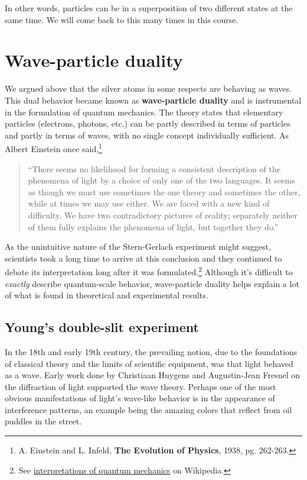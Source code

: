In other words, particles can be in a superposition of two different states at the same time. We will come back to this many times in this course. \par


\section{Wave-particle duality}
We argued above that the silver atoms in some respects are behaving as waves. This dual behavior became known as \textbf{wave-particle duality} and is instrumental in the formulation of quantum mechanics. The theory states that elementary particles (electrons, photons, etc.) can be partly described in terms of particles and partly in terms of waves, with no single concept individually sufficient. As Albert Einstein once said,\footnote{A. Einstein and L. Infeld, \textbf{The Evolution of Physics}, 1938, pg. 262-263.}
\begin{quote}
	``There seems no likelihood for forming a consistent description of the phenomena of light by a choice of only one of the two languages. It seems as though we must use sometimes the one theory and sometimes the other, while at times we may use either. We are faced with a new kind of difficulty. We have two contradictory pictures of reality; separately neither of them fully explains the phenomena of light, but together they do.''
\end{quote}

As the unintuitive nature of the Stern-Gerlach experiment might suggest, scientists took a long time to arrive at this conclusion and they continued to debate its interpretation long after it was formulated.\footnote{See \href{https://en.wikipedia.org/wiki/Interpretations\_of\_quantum\_mechanics}{interpretations of quantum mechanics} on Wikipedia.} Although it's difficult to \emph{exactly} describe quantum-scale behavior, wave-particle duality helps explain a lot of what is found in theoretical and experimental results.


\subsection{Young's double-slit experiment} \label{sec:double-slit}
In the 18th and early 19th century, the prevailing notion, due to the foundations of classical theory and the limits of scientific equipment, was that light behaved as a wave. Early work done by Christiaan Huygens and Augustin-Jean Fresnel on the diffraction of light supported the wave theory. Perhaps one of the most obvious manifestations of light's wave-like behavior is in the appearance of interference patterns, an example being the amazing colors that reflect from oil puddles in the street. \par

